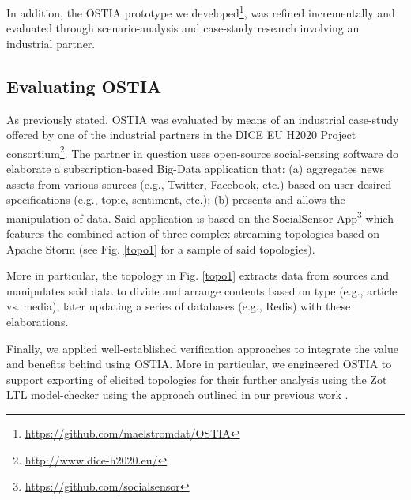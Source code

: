 In addition, the OSTIA prototype we developed\footnote{\url{https://github.com/maelstromdat/OSTIA}}, was refined incrementally and evaluated through scenario-analysis and case-study research \cite{casestudy} involving an industrial partner. 

\subsection{Evaluating OSTIA}

As previously stated, OSTIA was evaluated by means of an industrial case-study offered by one of the industrial partners in the DICE EU H2020 Project consortium\footnote{\url{http://www.dice-h2020.eu/}}. The partner in question uses open-source social-sensing software do elaborate a subscription-based Big-Data application that: (a) aggregates news assets from various sources (e.g., Twitter, Facebook, etc.) based on user-desired specifications (e.g., topic, sentiment, etc.); (b) presents and allows the manipulation of data. Said application is based on the SocialSensor App\footnote{\url{https://github.com/socialsensor}} which features the combined action of three complex streaming topologies based on Apache Storm (see Fig. \ref{topo1} for a sample of said topologies).

More in particular, the topology in Fig. \ref{topo1} extracts data from sources and manipulates said data to divide and arrange contents based on type (e.g., article vs. media), later updating a series of databases (e.g., Redis) with these elaborations.


Finally, we applied well-established verification approaches to integrate the value and benefits behind using OSTIA. More in particular, we engineered OSTIA to support exporting of elicited topologies for their further analysis using the Zot LTL model-checker \cite{zot} using the approach outlined in our previous work \cite{icsoft}.